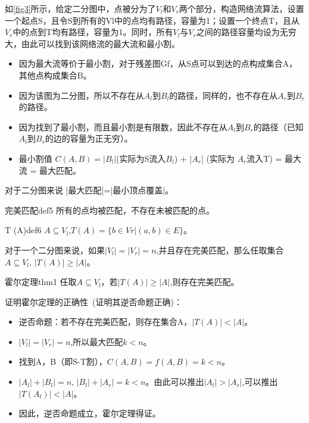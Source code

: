 \begin{example}
	如\autoref{fig3}所示，给定二分图中，点被分为了\(V_l\)和\(V_r\)两个部分，构造网络流算法，设置一个起点S，且令S到所有的Vl中的点均有路径，容量为1；设置一个终点T，且从\(V_r\)中的点到T均有路径，容量为1。同时，所有\(V_l\)与\(V_r\)之间的路径容量均设为无穷大，由此可以找到该网络流的最大流和最小割。
\end{example}

\begin{itemize}
	\item 因为最大流等价于最小割，对于残差图Gf，从S点可以到达的点构成集合A，其他点构成集合B。
	\item 因为该图为二分图，所以不存在从\(A_l\)到\(B_l\)的路径，同样的，也不存在从\(A_r\)到\(B_r\)的路径。
	\item 因为找到了最小割，而且最小割是有限数，因此不存在从\(A_l\)到\(B_r\)的路径（已知\(A_l\)到\(B_r\)的边的容量为正无穷）。
	\item 最小割值 \(C(A,B) =|B_l|\)(实际为S流入\(B_l\)) + |\(A_r\)| (实际为 \(A_r\)流入T) = 最大流 = 最大匹配。
\end{itemize}
对于二分图来说 |最大匹配|=|最小顶点覆盖|。

\begin{definition}{完美匹配}{def5}
	所有的点均被匹配，不存在未被匹配的点。
\end{definition}

\begin{definition}{T (A)}{def6}
	\(A \subseteq V_l\),\(T(A) = \{b \in Vr | (a,b) \in E \} \)。
\end{definition}

对于一个二分图来说，如果\(|V_l|=|V_r|=n\),并且存在完美匹配，那么任取集合\(A \subseteq V_l,\,|T(A)| \ge |A|\)。

\begin{theorem}{霍尔定理}{thm1}
	任取\(A \subseteq V_l\)，若\(|T(A)| \ge |A|\),则存在完美匹配。
\end{theorem}
证明霍尔定理的正确性~(证明其逆否命题正确)：
\begin{itemize}
	\item 逆否命题：若不存在完美匹配，则存在集合A，\(|T(A)| < |A|\)。
	\item \(|V_l|=|V_r|=n\),所以最大匹配\(k<n\)。
	\item 找到A，B（即S-T割），\(C(A,B) = f(A,B) = k<n\)。
	\item \(|A_l|+|B_l| = n,\,|B_l|+|A_r| = k < n\)。由此可以推出\(|A_l| > |A_r|\),可以推出\(|T(A_l)| < |A|\)。
	\item 因此，逆否命题成立，霍尔定理得证。
\end{itemize}

